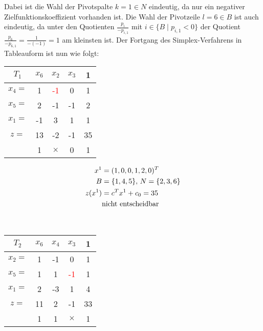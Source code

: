 \begin{example}
	Dabei ist die Wahl der Pivotspalte $k=1\in N$ eindeutig, da nur ein negativer Zielfunktionskoeffizient vorhanden ist. Die Wahl  der Pivotzeile $l=6\in B$ ist auch eindeutig, da unter den Quotienten $\frac{p_i}{-p_{i,1}}$ mit $i\in \{B\mid p_{i,1}<0\}$ der Quotient $\frac{p_6}{-p_{6,1}}=\frac{1}{-(-1)}=1$ am kleinsten ist. Der Fortgang des Simplex-Verfahrens in Tableauform ist nun wie folgt: \\
	\begin{minipage}[c]{0.6\textwidth}
		\begin{center}
			\begin{tabular}{c|ccc|c}
				$T_1$ & $x_6$ & $x_2$ & $x_3$ & 1 \\
				\hline
				$x_4=$ & 1 & \textcolor{red}{-1} & 0 & 1 \\
				\hline 
				$x_5=$ & 2 & -1 & -1 & 2 \\
				\hline 
				$x_1=$ & -1 & 3 & 1 & 1 \\
				\hline
				$z=$ & 13 & -2 & -1 & 35 \\
				\hline
				& 1 & $\times$ & 0 & 1
			\end{tabular}
		\end{center}
	\end{minipage}
	\begin{minipage}[c]{0.3\textwidth}
		\begin{align}
		x^1 &= (1,0,0,1,2,0)^T\notag \\
		B &= \{1,4,5\},\, N=\{2,3,6\}\notag \\
		z(x^1) &= c^Tx^1 + c_0 = 35 \notag \\
		&\text{nicht entscheidbar} \notag 
		\end{align}
	\end{minipage} \\
	\begin{minipage}[c]{0.6\textwidth}
		\begin{center}
			\begin{tabular}{c|ccc|c}
				$T_2$ & $x_6$ & $x_4$ & $x_3$ & 1 \\
				\hline
				$x_2=$ & 1 & -1 & 0 & 1 \\
				\hline 
				$x_5=$ & 1 & 1 & \textcolor{red}{-1} & 1 \\
				\hline 
				$x_1=$ & 2 & -3 & 1 & 4 \\
				\hline
				$z=$ & 11 & 2 & -1 & 33 \\
				\hline
				& 1 & 1 & $\times$ & 1
			\end{tabular}
		\end{center}

\end{minipage}
\end{example}
